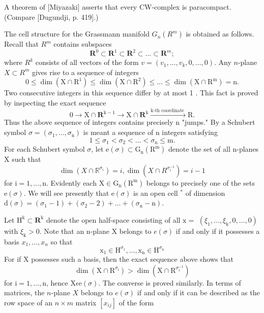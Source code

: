 \documentclass[10pt]{article}
\begin{document}
A theorem of [Miyazaki] asserts that every CW-complex is paracompact. (Compare [Dugundji, p. 419].)

The cell structure for the Grassmann manifold $G_{n}\left(R^{m}\right)$ is obtained as follows. Recall that $R^{m}$ contains subspaces
$$
\mathbf{R}^{0} \subset \mathbf{R}^{1} \subset \mathbf{R}^{2} \subset \ldots \subset \mathbf{R}^{m} ;
$$
where $R^{k}$ consists of all vectors of the form $v=\left(v_{1}, \ldots, v_{k}, 0, \ldots, 0\right)$. Any $n$-plane $X \subset R^{m}$ gives rise to a sequence of integers
$$
0 \leq \operatorname{dim}\left(\mathrm{X} \cap \mathrm{R}^{1}\right) \leq \operatorname{dim}\left(\mathrm{X} \cap \mathrm{R}^{2}\right) \leq \ldots \leq \operatorname{dim}\left(\mathrm{X} \cap \mathrm{R}^{\mathrm{m}}\right)=\mathrm{n} .
$$
Two consecutive integers in this sequence differ by at most 1 . This fact is proved by inspecting the exact sequence
$$
0 \rightarrow \mathrm{X} \cap \mathbf{R}^{\mathrm{k}-1} \rightarrow \mathrm{X} \cap \mathbf{R}^{\mathrm{k}} \stackrel{\mathrm{k} \text {-th coordinate }}{\rightarrow} \mathrm{R} .
$$
Thus the above sequence of integers contains precisely $\mathrm{n}$ "jumps." By a Schubert symbol $\sigma=\left(\sigma_{1}, \ldots, \sigma_{\mathrm{n}}\right)$ is meant a sequence of $\mathrm{n}$ integers satisfying
$$
1 \leq \sigma_{1}<\sigma_{2}<\ldots<\sigma_{\mathrm{n}} \leq \mathrm{m} .
$$
For each Schubert symbol $\sigma$, let $\mathrm{e}(\sigma) \subset \mathrm{G}_{\mathrm{n}}\left(\mathrm{R}^{\mathrm{m}}\right)$ denote the set of all n-planes $\mathrm{X}$ such that
$$
\operatorname{dim}\left(X \cap \mathbb{R}^{\sigma_{i}}\right)=i, \operatorname{dim}\left(X \cap R^{\sigma_{i}^{-1}}\right)=i-1
$$
for $\mathrm{i}=1, \ldots, \mathrm{n}$. Evidently each $\mathrm{X} \in \mathrm{G}_{\mathrm{n}}\left(\mathrm{R}^{\mathrm{m}}\right)$ belongs to precisely one of the sets $\mathrm{e}(\sigma)$. We will see presently that $\mathrm{e}(\sigma)$ is an open cell ${ }^{*}$ of dimension $\mathrm{d}(\sigma)=\left(\sigma_{1}-1\right)+\left(\sigma_{2}-2\right)+\ldots+\left(\sigma_{\mathrm{n}}-\mathrm{n}\right)$.

Let $\mathrm{H}^{\mathrm{k}} \subset \mathbf{R}^{\mathrm{k}}$ denote the open half-space consisting of all $\mathrm{x}=$ $\left(\xi_{1}, \ldots, \xi_{\mathrm{k}}, 0, \ldots, 0\right)$ with $\xi_{\mathrm{k}}>0$. Note that an $\mathrm{n}$-plane $\mathrm{X}$ belongs to $e(\sigma)$ if and only if it possesses a basis $x_{1}, \ldots, x_{n}$ so that
$$
\mathrm{x}_{1} \in \mathrm{H}^{\sigma_{1}}, \ldots, \mathrm{x}_{\mathrm{n}} \in \mathrm{H}^{\sigma_{\mathrm{n}}}
$$
For if $\mathrm{X}$ possesses such a basis, then the exact sequence above shows that
$$
\operatorname{dim}\left(\mathrm{X} \cap \mathrm{R}^{\sigma_{\mathrm{i}}}\right)>\operatorname{dim}\left(\mathrm{X} \cap \mathrm{R}^{\sigma_{\mathrm{i}}^{-1}}\right)
$$
for $\mathrm{i}=1, \ldots, \mathrm{n}$, hence $\mathrm{X} \epsilon \mathrm{e}(\sigma)$. The converse is proved similarly. In terms of matrices, the $n$-plane $X$ belongs to $e(\sigma)$ if and only if it can be described as the row space of an $n \times m$ matrix $\left[x_{i j}\right]$ of the form
\end{document}
